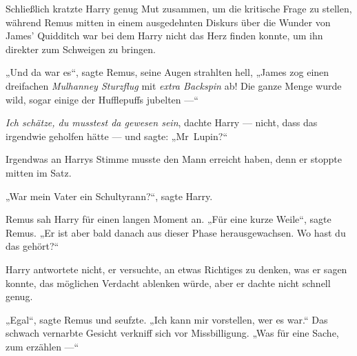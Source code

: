 Schließlich kratzte Harry genug Mut zusammen, um die kritische Frage zu stellen, während Remus mitten in einem ausgedehnten Diskurs über die Wunder von James’ Quidditch war bei dem Harry nicht das Herz finden konnte, um ihn direkter zum Schweigen zu bringen.

„Und da war es“, sagte Remus, seine Augen strahlten hell,
„James zog einen dreifachen \emph{Mulhanney Sturzflug} mit \emph{extra Backspin} ab! Die ganze Menge wurde wild, sogar einige der Hufflepuffs jubelten —“

\emph{Ich schätze, du musstest da gewesen sein}, dachte Harry — nicht, dass das irgendwie geholfen hätte — und sagte:
„Mr~Lupin?“

Irgendwas an Harrys Stimme musste den Mann erreicht haben, denn er stoppte mitten im Satz.

„War mein Vater ein Schultyrann?“, sagte Harry.

Remus sah Harry für einen langen Moment an.
„Für eine kurze Weile“, sagte Remus.
„Er ist aber bald danach aus dieser Phase herausgewachsen. Wo hast du das gehört?“

Harry antwortete nicht, er versuchte, an etwas Richtiges zu denken, was er sagen konnte, das möglichen Verdacht ablenken würde, aber er dachte nicht schnell genug.

„Egal“, sagte Remus und seufzte.
„Ich kann mir vorstellen, wer es war.“ Das schwach vernarbte Gesicht verkniff sich vor Missbilligung.
„Was für eine Sache, zum erzählen —“

